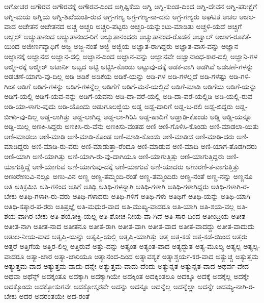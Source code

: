 {ಅಗೋಚರ
ಅಗೌರವ
ಅಗೌರವಕ್ಕೆ
ಅಗೌರವ-ದಿಂದ
ಅಗ್ಗಿಷ್ಟಿಕೆಯ
ಅಗ್ನಿ
ಅಗ್ನಿ-ಕುಂಡ-ದಿಂದ
ಅಗ್ನಿ-ದೇವನ
ಅಗ್ನಿ-ಪರೀಕ್ಷೆಗೆ
ಅಗ್ನಿ-ಮಯ
ಅಗ್ನಿಯ
ಅಗ್ನಿ-ಶಿಖೆಯಂತಿ-ರುವ
ಅಗ್ರ-ಗಣ್ಯ
ಅಗ್ರ-ಗಣ್ಯ-ನಾ-ದನು
ಅಗ್ರ-ಗಣ್ಯರು
ಅಘಟಿತ
ಅಚಲ
ಅಚಲ-ವಾದ
ಅಚೇತನ
ಅಚೇತನದ
ಅಚ್ಚ
ಅಚ್ಚರಿ
ಅಚ್ಚರಿ-ಪಟ್ಟರು
ಅಚ್ಚರಿ-ಯನ್ನುಂಟು-ಮಾಡಿತು
ಅಚ್ಚಳಿ-ಯದೆ
ಅಚ್ಚಿಗೆ
ಅಚ್ಬಲ್
ಅಚ್ಯುತಾನಂದ
ಅಚ್ಯುತಾನಂದ-ರಿಗೆ
ಅಚ್ಯುತಾನಂದರು
ಅಚ್ಯುತಾನಂದ-ರೊಡನೆ
ಅಚ್ವಾಲ್
ಅಜಾಗ-ರೂಕತೆ-ಯಿಂದ
ಅಜೀರ್ಣವ್ಯಾಧಿಗೆ
ಅಜ್ಜ
ಅಜ್ಜ-ನಂತೆ
ಅಜ್ಜಿ
ಅಜ್ಜಿಯ
ಅಜ್ಞಾತ-ರಾಗಿದ್ದರು
ಅಜ್ಞಾತ-ವಾಸ-ವನ್ನು
ಅಜ್ಞಾನ
ಅಜ್ಞಾನಕ್ಕೆ
ಅಜ್ಞಾನದ
ಅಜ್ಞಾನ-ದಲ್ಲಿ
ಅಜ್ಞಾನ-ದಿಂದ
ಅಜ್ಞಾನ-ವನ್ನು
ಅಜ್ಞಾನವೇ
ಅಜ್ಞಾನಾಂಧ-ಕಾರ-ದಲ್ಲಿ
ಅಜ್ಞಾನಿ-ಗಳ
ಅಜ್ಮೀ-ರಕ್ಕೆ
ಅಜ್ಮೀರ್
ಅಟಾರ್ನಿ
ಅಟ್ಟದ
ಅಟ್ಟಿ
ಅಟ್ಟಿಸಿ-ಕೊಂಡು
ಅಟ್ಟುವು-ದಕ್ಕೆ
ಅಡಕ-ವಾಗಿ
ಅಡಗಿವೆ
ಅಡಚಣೆ-ಗಳನ್ನು
ಅಡಚಣೆ-ಯಾಗು-ವು-ದಿಲ್ಲ
ಅಡಿ
ಅಡಿಕೆ
ಅಡಿಕೆಯ
ಅಡಿಕೆ-ಯನ್ನು
ಅಡಿ-ಗಳ
ಅಡಿ-ಗಳಲ್ಲದೆ
ಅಡಿ-ಗಳಷ್ಟು
ಅಡಿ-ಗಳಿ-ಗಿಂತ
ಅಡಿಗೆ
ಅಡಿಗೆ-ಗಳನ್ನು
ಅಡಿಗೆ-ಗಳನ್ನೆಲ್ಲ
ಅಡಿಗೆಗೆ
ಅಡಿಗೆ-ಮನೆ-ಯಲ್ಲಿದೆ
ಅಡಿಗೆ-ಮಾಡಿ
ಅಡಿಗೆಯ
ಅಡಿಗೆ-ಯನ್ನು
ಅಡಿಗೆ-ಯಲ್ಲಿ
ಅಡಿಗೆ-ಯವ-ನನ್ನು
ಅಡಿಗೆ-ಯವನು
ಅಡಿ-ದಾ-ವರೆ-ಯಲ್ಲಿ
ಅಡಿ-ದಾ-ವರೆ-ಯಲ್ಲಿಡಿ
ಅಡಿ-ಯಲ್ಲಿ-ರುವ
ಅಡಿ-ಯಾ-ಳಾಗು-ವುದು
ಅಡಿ-ಯೊಂದು
ಅಡುಗೂಲಜ್ಜಿಯ
ಅಡ್ಡ
ಅಡ್ಡ-ದಾರಿಗೆ
ಅಡ್ಡ-ಬ-ರಲಿ
ಅಡ್ಡ-ಬಿದ್ದರು
ಅಡ್ಡ-ಬೀಳು-ವು-ದಿಲ್ಲ
ಅಡ್ಡ-ಲಾಗಿತ್ತು
ಅಡ್ಡ-ಲಾಗಿದ್ದ
ಅಡ್ಡ-ಲಾ-ಗಿರಿಸಿ
ಅಡ್ಡ-ಹಾದಿಗೆ
ಅಡ್ಡಾಡಿ-ಕೊಂಡು
ಅಡ್ಡಿ
ಅಡ್ಡಿ-ಯನ್ನೂ
ಅಡ್ಡಿ-ಯಿಲ್ಲ
ಅಣಕಿ-ಸಿದ್ದರು
ಅಣಕಿಸಿ-ರು-ವೆನು
ಅಣಕಿಸು-ವಂತಹ
ಅಣಿ
ಅಣಿ-ಗೊಳಿಸಿ-ಕೊಂಡು
ಅಣಿ-ಮಾಡಲಾ-ಯಿತು
ಅಣಿ-ಮಾಡಲು
ಅಣಿ-ಮಾಡಿ
ಅಣಿ-ಮಾಡಿ-ಕೊಂಡ
ಅಣಿ-ಮಾಡಿ-ಕೊಂಡು
ಅಣಿ-ಮಾಡಿದ
ಅಣಿ-ಮಾಡಿ-ದರು
ಅಣಿ-ಮಾಡಿದ್ದರು
ಅಣಿ-ಮಾಡಿ-ರು-ವರು
ಅಣಿ-ಮಾಡುತ್ತಾ-ರೆಂದೂ
ಅಣಿ-ಮಾಡುವ
ಅಣಿ-ಮಾದಿ
ಅಣಿ-ಯಾಗ-ತೊಡಗಿದರು
ಅಣಿ-ಯಾಗಿ
ಅಣಿ-ಯಾಗಿತ್ತು
ಅಣಿ-ಯಾಗಿ-ರು-ವು-ದಾಗಿಯೂ
ಅಣಿ-ಯಾಗುತ್ತಿತ್ತು
ಅಣಿ-ಯಾಗುತ್ತಿದ್ದರು
ಅಣಿ-ಯಾಗುತ್ತಿದ್ದೆ
ಅಣಿ-ಯಾಗುವ
ಅಣಿ-ಯಾಗುವು-ದಕ್ಕೆ
ಅಣಿ-ಯಾಗುವೆ
ಅಣಿ-ಯಾದರು
ಅಣುರಣಿ-ತ-ವಾಗುತ್ತಿತ್ತು
ಅಣುರೇಣುವಿ-ನಲ್ಲೂ
ಅಣು-ವಿನ
ಅಣ್ಣ
ಅಣ್ಣ-ತಮ್ಮಂದಿ-ರಂತೆ
ಅಣ್ಣ-ತಮ್ಮಂದಿರು
ಅಣ್ಣ-ನಂತೆ
ಅಣ್ಣ-ನನ್ನು
ಅಣ್ಣನೂ
ಅತಿ
ಅತಿಕ್ರಮಿಸಿ
ಅತಿ-ಗಳಿಂದ
ಅತಿಗೆ
ಅತಿಥಿ
ಅತಿಥಿ-ಗಳನ್ನಾಗಿ
ಅತಿಥಿ-ಗಳಾಗಿ
ಅತಿಥಿ-ಗಳಾಗಿದ್ದರು
ಅತಿಥಿ-ಗಳಾಗಿ-ರ-ಬೇಕು
ಅತಿಥಿ-ಗಳಾಗಿ-ರು-ವರು
ಅತಿಥಿ-ಗಳಾದರು
ಅತಿಥಿ-ಗಳಿಗೆ
ಅತಿಥಿ-ಗಳು
ಅತಿಥಿಗೆ
ಅತಿಥಿ-ಯನ್ನು
ಅತಿಥಿ-ಯಾಗಿ
ಅತಿಥಿ-ಸತ್ಕಾರ-ಪ-ರರು
ಅತಿಪ್ರಜ್ಞೆ
ಅತಿ-ಮಧುರ-ವಾದ
ಅತಿ-ಮುಖ್ಯ-ವಾದರೂ
ಅತಿ-ಯಾಗಿ
ಅತಿ-ಶಯ-ವಲ್ಲ
ಅತಿ-ಶಯ-ವಾಗಿರ-ಬೇಕು
ಅತಿ-ಶಯೋಕ್ತಿ-ಯಲ್ಲ
ಅತಿ-ಶೋಚ-ನೀಯ-ವಾ-ಗಿದೆ
ಅತಿ-ಸಾರ-ದಿಂದ
ಅತೀಂದ್ರಿಯ
ಅತೀತ
ಅತೀತ-ನಾಗಿ
ಅತೀತ-ನಾದ
ಅತೀತನೂ
ಅತೀತ-ರಾಗಿ
ಅತೀತ-ವಾಗಿ
ಅತೀತ-ವಾದ
ಅತೀತ-ವಾದದ್ದು
ಅತೀತ-ವಾದುದು
ಅತುಲ-ನೀಯ-ವಾದ
ಅತೃಪ್ತಿ-ಯನ್ನು
ಅತೃಪ್ತಿ-ಯಲ್ಲಿ
ಅತೃಪ್ತಿ-ಯಾಗಿತ್ತು
ಅತ್ತ
ಅತ್ತ-ಕಡೆ
ಅತ್ತ-ಕಡೆ-ಯಿಂದ
ಅತ್ತರು
ಅತ್ತರೆ
ಅತ್ತಿಗೆಯ
ಅತ್ತಿರ-ಲಿಲ್ಲ
ಅತ್ತಿರುವೆ
ಅತ್ತು-ದನ್ನು
ಅತ್ಯಂತ
ಅತ್ಯಂತ-ವಾದ
ಅತ್ಯದ್ಭುತ
ಅತ್ಯ-ಮೂಲ್ಯ
ಅತ್ಯಲ್ಪ
ಅತ್ಯಲ್ಪ-ವಾದರೂ
ಅತ್ಯಾ-ಚಾರ
ಅತ್ಯಾ-ಚಾರಿಯೂ
ಅತ್ಯಾನಂದ-ದಿಂದ
ಅತ್ಯಾವಶ್ಯಕ
ಅತ್ಯಾಶ್ಚರ್ಯ-ಕರ-ವಾದ
ಅತ್ಯುಚ್ಚ
ಅತ್ಯುತ್ತಮ
ಅತ್ಯುತ್ತಮ-ವಾದ
ಅತ್ಯುತ್ತಮ-ವಾದು-ದನ್ನೇ
ಅತ್ಯುತ್ತಮ-ವಾದು-ದೆಂದು
ಅತ್ಯುನ್ನತ
ಅತ್ಯುನ್ನತ-ವಾದ
ಅಥರ್ವ-ವೇದ
ಅಥವಾ
ಅಥೆನ್ಸ್
ಅದಕ್ಕಂತೂ
ಅದಕ್ಕಾಗಿ
ಅದಕ್ಕಾಗಿಯೇ
ಅದಕ್ಕಿಂತ
ಅದಕ್ಕಿಂತಲೂ
ಅದಕ್ಕೂ
ಅದಕ್ಕೆ
ಅದಕ್ಕೆಲ್ಲ
ಅದಕ್ಕೇ
ಅದಕ್ಕೊಂದು
ಅದಕ್ಕೋಸುಗವೇ
ಅದಕ್ಕೋಸ್ಕರವೇ
ಅದನ್ನು
ಅದನ್ನೂ
ಅದನ್ನೆಲ್ಲ
ಅದನ್ನೆಲ್ಲಾ
ಅದನ್ನೇ
ಅದಮ್ಯ-ನಾಗಿ-ರ-ಬೇಕು
ಅದರ
ಅದರಂತಯೇ
ಅದ-ರಂತೆ
}

